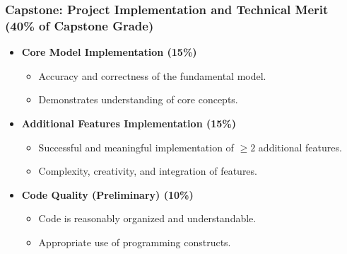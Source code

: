 \documentclass{beamer}
\begin{document}
\begin{frame}[t]
\frametitle{Capstone: Project Implementation and Technical Merit (40\% of Capstone Grade)}
\begin{itemize}
    \item \textbf{Core Model Implementation (15\%)}
    \begin{itemize}
        \item Accuracy and correctness of the fundamental model.
        \item Demonstrates understanding of core concepts.
    \end{itemize}
    \vspace{0.5em}
    \item \textbf{Additional Features Implementation (15\%)}
    \begin{itemize}
        \item Successful and meaningful implementation of $\geq 2$ additional features.
        \item Complexity, creativity, and integration of features.
    \end{itemize}
    \vspace{0.5em}
    \item \textbf{Code Quality (Preliminary) (10\%)}
    \begin{itemize}
        \item Code is reasonably organized and understandable.
        \item Appropriate use of programming constructs.
    \end{itemize}
\end{itemize}
\end{frame}

\end{document}
